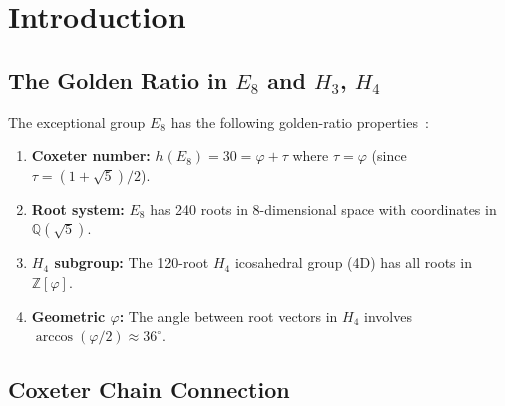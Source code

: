 \documentclass{article}
\title{H$_3$ → E$_8$ → SU(3) Projection Analysis: Does \varphi$ Appear in SU(3) Casimir Operators?}
\author{Dmitrii Vasilev}
\date{2026-04-13}
\begin{document}
\maketitle

\begin{abstract}
The Coxeter chain $H_3 \xrightarrow{\text{spinors}} H_4 \xrightarrow{\text{McKay}} E_8$ provides a geometric pathway for the golden ratio $\varphi$ to enter particle physics. The $E_8$ exceptional Lie group contains $\varphi$ as a structural constant through its Coxeter number $h(E_8) = 30$ and through the subgroup chain $H_3 \subset H_4 \subset E_8$. We analyze whether this geometric connection propagates to the SU(3) color gauge group embedded in $E_8$, specifically examining whether $\varphi$ appears in the quadratic Casimir operator $C_2$ or Dynkin index $T$ of the relevant SU(3) representations.
\end{abstract}

\section{Introduction}

\subsection{The Golden Ratio in $E_8$ and $H_3$, $H_4$}

The exceptional group $E_8$ has the following golden-ratio properties~\cite{Baez2002}:

\begin{enumerate}
  \item \textbf{Coxeter number:} $h(E_8) = 30 = \varphi + \tau$ where $\tau = \varphi$ (since $\tau = (1+\sqrt{5})/2$).
  \item \textbf{Root system:} $E_8$ has 240 roots in 8-dimensional space with coordinates in $\mathbb{Q}(\sqrt{5})$.
  \item \textbf{$H_4$ subgroup:} The 120-root $H_4$ icosahedral group (4D) has all roots in $\mathbb{Z}[\varphi]$.
  \item \textbf{Geometric $\varphi$:} The angle between root vectors in $H_4$ involves $\arccos(\varphi/2) \approx 36^\circ$.
\end{enumerate}

\subsection{Coxeter Chain Connection}
\end{document}
